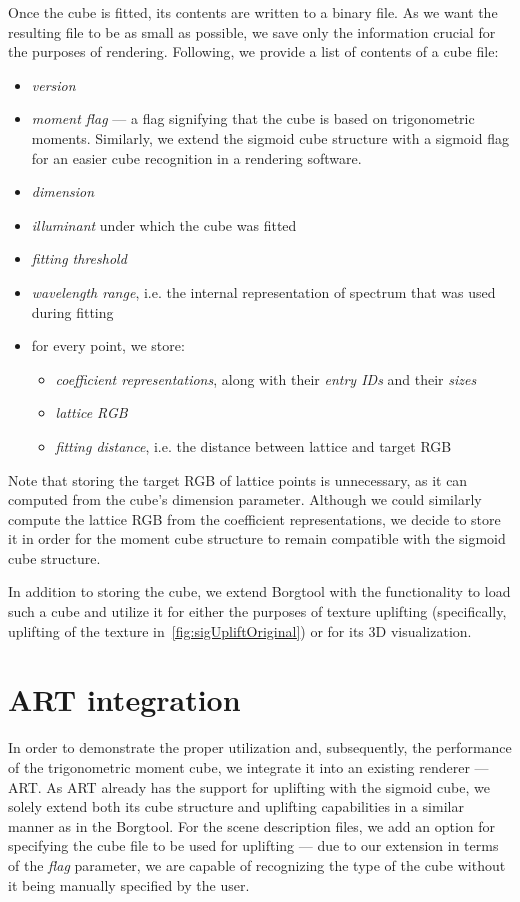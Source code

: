 Once the cube is fitted, its contents are written to a binary file. As we want the resulting file to be as small as possible, we save only the information crucial for the purposes of rendering. Following, we provide a list of contents of a cube file:
\begin{itemize}
	\item \emph{version}
	\item \emph{moment flag} --- a flag signifying that the cube is based on trigonometric moments. Similarly, we extend the sigmoid cube structure with a sigmoid flag for an easier cube recognition in a rendering software.
	\item \emph{dimension}
	\item \emph{illuminant} under which the cube was fitted
	\item \emph{fitting threshold}
	\item \emph{wavelength range}, i.e. the internal representation of spectrum that was used during fitting
	\item for every point, we store:
	\begin{itemize}
		\item \emph{coefficient representations}, along with their \emph{entry IDs} and their \emph{sizes}
		\item \emph{lattice RGB}
		\item \emph{fitting distance}, i.e. the distance between lattice and target RGB
	\end{itemize}
\end{itemize}

Note that storing the target RGB of lattice points is unnecessary, as it can computed from the cube's dimension parameter. Although we could similarly compute the lattice RGB from the coefficient representations, we decide to store it in order for the moment cube structure to remain compatible with the sigmoid cube structure.

In addition to storing the cube, we extend Borgtool with the functionality to load such a cube and utilize it for either the purposes of texture uplifting (specifically, uplifting of the texture in~\cref{fig:sigUpliftOriginal}) or for its 3D visualization.

\section{ART integration} \label{sec:rendererIntegration}

In order to demonstrate the proper utilization and, subsequently, the performance of the trigonometric moment cube, we integrate it into an existing renderer --- ART. As ART already has the support for uplifting with the sigmoid cube, we solely extend both its cube structure and uplifting capabilities in a similar manner as in the Borgtool. For the scene description files, we add an option for specifying the cube file to be used for uplifting --- due to our extension in terms of the \emph{flag} parameter, we are capable of recognizing the type of the cube without it being manually specified by the user.


